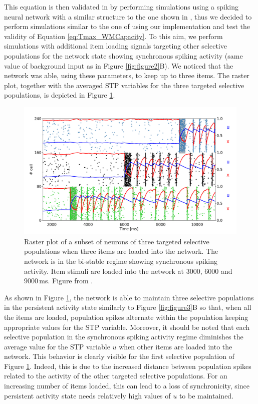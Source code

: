 \documentclass[a4paper, 12pt, twoside, openright]{book}
\begin{document}
This equation is then validated in \cite{mi_katkov_tsodyks2017} by performing simulations using a spiking neural network with a similar structure to the one shown in \cite{Mongillo2008}, thus we decided to perform simulations similar to the one of \cite{mi_katkov_tsodyks2017} using our implementation and test the validity of Equation \eqref{eq:Tmax_WMCapacity}. To this aim, we perform simulations with additional item loading signals targeting other selective populations for the network state showing synchronous spiking activity (same value of background input as in Figure \ref{fig:figure2}B). We noticed that the network was able, using these parameters, to keep up to three items. The raster plot, together with the averaged STP variables for the three targeted selective populations, is depicted in Figure \ref{fig:figure4}.

\begin{figure}[h]
    \centering
    \includegraphics[width=0.9\columnwidth]{figures/fig4.png}
    \caption{Raster plot of a subset of neurons of three targeted selective populations when three items are loaded into the network. 
    The network is in the bi-stable regime showing synchronous spiking activity. Item stimuli are loaded into the network at $3000$, $6000$ and $9000$\,ms. Figure from \cite{Tiddia2022_WM}.}
    \label{fig:figure4}
\end{figure}


As shown in Figure \ref{fig:figure4}, the network is able to maintain three selective populations in the persistent activity state similarly to Figure \ref{fig:figure3}B so that, when all the items are loaded, population spikes alternate within the population keeping appropriate values for the STP variable. Moreover, it should be noted that each selective population in the synchronous spiking activity regime diminishes the average value for the STP variable $u$ when other items are loaded into the network. This behavior is clearly visible for the first selective population of Figure \ref{fig:figure4}. Indeed, this is due to the increased distance between population spikes related to the activity of the other targeted selective populations. For an increasing number of items loaded, this can lead to a loss of synchronicity, since persistent activity state needs relatively high values of $u$ to be maintained.
\end{document}
